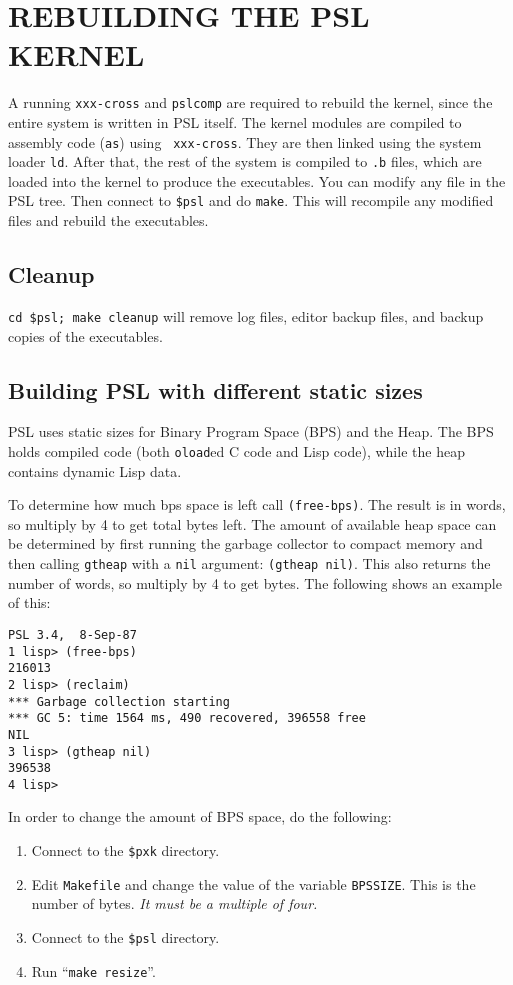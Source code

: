 \section{REBUILDING THE PSL KERNEL}

A running {\tt xxx-cross} and {\tt pslcomp} are required to rebuild
the kernel, since the entire system is written in PSL itself.  The
kernel modules are compiled to assembly code ({\tt as}) using {\tt
xxx-cross}.  They are then linked using the system loader {\tt ld}.
After that, the rest of the system is compiled to {\tt .b} files,
which are loaded into the kernel to produce the executables.  You can
modify any file in the PSL tree.  Then connect to {\tt \$psl} and do
{\tt make}.  This will recompile any modified files and rebuild the
executables.

\subsection{Cleanup}

{\tt cd \$psl; make cleanup} will remove log files, editor backup files, and
backup copies of the executables.

\subsection{Building PSL with different static sizes}

PSL uses static sizes for Binary Program Space (BPS) and the Heap.
The BPS holds compiled code (both {\tt oload}ed C code and Lisp code),
while the heap contains dynamic Lisp data.

To determine how much bps space is left call {\tt (free-bps)}.  The
result is in words, so multiply by 4 to get total bytes left.  The
amount of available heap space can be determined by first running the
garbage collector to compact memory and then calling {\tt gtheap}
with a {\tt nil} argument: {\tt (gtheap nil)}.  This also returns the
number of words, so multiply by 4 to get bytes.  The following shows
an example of this:

\begin{verbatim}
PSL 3.4,  8-Sep-87
1 lisp> (free-bps)
216013
2 lisp> (reclaim)
*** Garbage collection starting
*** GC 5: time 1564 ms, 490 recovered, 396558 free
NIL
3 lisp> (gtheap nil)
396538
4 lisp> 
\end{verbatim}

In order to change the amount of BPS space, do the following:

\begin{enumerate}

\item Connect to the {\tt \$pxk} directory.

\item Edit {\tt Makefile} and change the value of the variable
{\tt BPSSIZE}.  This is the number of bytes. {\it It must be a
multiple of four.}

\item Connect to the {\tt \$psl} directory.

\item Run ``{\tt make resize}''.

\end{enumerate}

